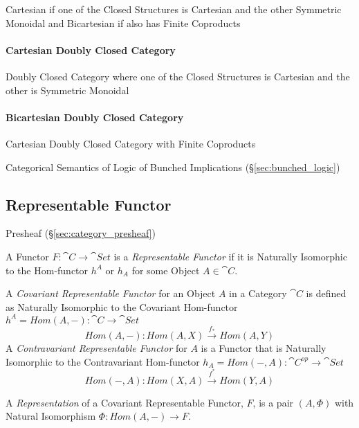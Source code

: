 Cartesian if one of the Closed Structures is Cartesian and the other
Symmetric Monoidal and Bicartesian if also has Finite Coproducts



\paragraph{Cartesian Doubly Closed Category}
\label{sec:cartesian_doubly_closed}\hfill

Doubly Closed Category where one of the Closed Structures is Cartesian
and the other is Symmetric Monoidal



\paragraph{Bicartesian Doubly Closed Category}
\label{sec:bicartesian_doubly_closed}\hfill

Cartesian Doubly Closed Category with Finite Coproducts

Categorical Semantics of Logic of Bunched Implications
(\S\ref{sec:bunched_logic})



\subsection{Representable Functor}\label{sec:representable_functor}

Presheaf (\S\ref{sec:category_presheaf})

A Functor $F : \cat{C} \rightarrow \cat{Set}$ is a
\emph{Representable Functor} if it is Naturally Isomorphic to the
Hom-functor $h^A$ or $h_A$ for some Object $A \in \cat{C}$.

A \emph{Covariant Representable Functor} for an Object $A$ in a
Category $\cat{C}$ is defined as Naturally Isomorphic to the
Covariant Hom-functor $h^A = Hom(A,-) : \cat{C} \rightarrow
\cat{Set}$
\[
  Hom(A,-) : Hom(A,X) \xrightarrow{f_*} Hom(A,Y)
\]
A \emph{Contravariant Representable Functor} for $A$ is a Functor that
is Naturally Isomorphic to the Contravariant Hom-functor $h_A =
Hom(-,A) : \cat{C^{op}} \rightarrow \cat{Set}$
\[
  Hom(-,A) : Hom(X,A) \xrightarrow{f^*} Hom(Y,A)
\]

A \emph{Representation} of a Covariant Representable Functor, $F$, is
a pair $(A, \Phi)$ with Natural Isomorphism $\Phi : Hom(A,-)
\rightarrow F$.

